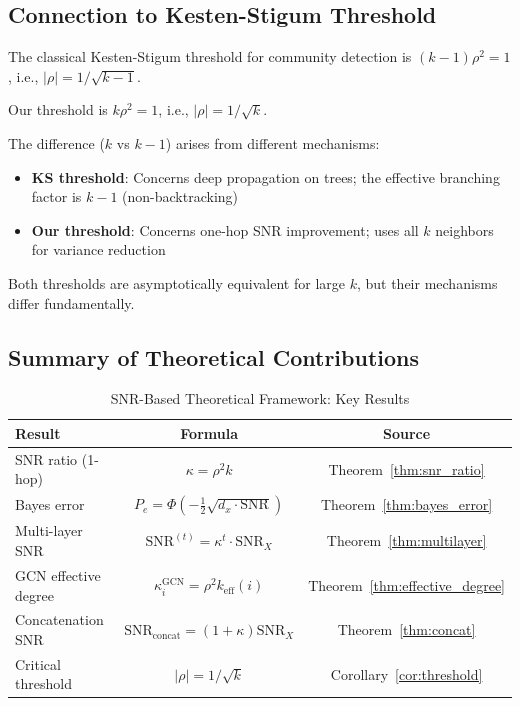 \subsection{Connection to Kesten-Stigum Threshold}
\label{subsec:ks}

\begin{remark}
The classical Kesten-Stigum threshold for community detection is $(k-1)\rho^2 = 1$, i.e., $|\rho| = 1/\sqrt{k-1}$.

Our threshold is $k\rho^2 = 1$, i.e., $|\rho| = 1/\sqrt{k}$.

The difference ($k$ vs $k-1$) arises from different mechanisms:
\begin{itemize}
    \item \textbf{KS threshold}: Concerns deep propagation on trees; the effective branching factor is $k-1$ (non-backtracking)
    \item \textbf{Our threshold}: Concerns one-hop SNR improvement; uses all $k$ neighbors for variance reduction
\end{itemize}
Both thresholds are asymptotically equivalent for large $k$, but their mechanisms differ fundamentally.
\end{remark}

\subsection{Summary of Theoretical Contributions}
\label{subsec:summary}

\begin{table}[t]
\centering
\caption{SNR-Based Theoretical Framework: Key Results}
\label{tab:snr_summary}
\begin{tabular}{@{}lcc@{}}
\toprule
\textbf{Result} & \textbf{Formula} & \textbf{Source} \\
\midrule
SNR ratio (1-hop) & $\kappa = \rho^2 k$ & Theorem~\ref{thm:snr_ratio} \\
Bayes error & $P_e = \Phi(-\frac{1}{2}\sqrt{d_x \cdot \mathrm{SNR}})$ & Theorem~\ref{thm:bayes_error} \\
Multi-layer SNR & $\mathrm{SNR}^{(t)} = \kappa^t \cdot \mathrm{SNR}_X$ & Theorem~\ref{thm:multilayer} \\
GCN effective degree & $\kappa_i^{\mathrm{GCN}} = \rho^2 k_{\mathrm{eff}}(i)$ & Theorem~\ref{thm:effective_degree} \\
Concatenation SNR & $\mathrm{SNR}_{\mathrm{concat}} = (1+\kappa) \mathrm{SNR}_X$ & Theorem~\ref{thm:concat} \\
Critical threshold & $|\rho| = 1/\sqrt{k}$ & Corollary~\ref{cor:threshold} \\
\bottomrule
\end{tabular}
\end{table}

